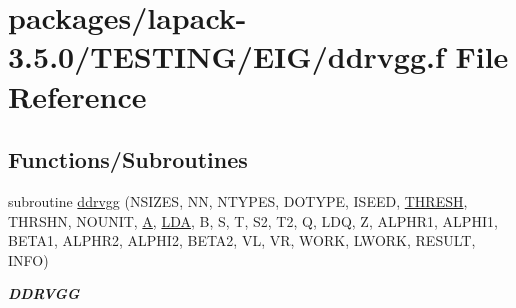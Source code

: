 \hypertarget{ddrvgg_8f}{}\section{packages/lapack-\/3.5.0/\+T\+E\+S\+T\+I\+N\+G/\+E\+I\+G/ddrvgg.f File Reference}
\label{ddrvgg_8f}
\subsection*{Functions/\+Subroutines}
\begin{DoxyCompactItemize}
\item 
subroutine \hyperlink{group__double__eig_gaf88edcce9dcbf23eda454e31d1b422db}{ddrvgg} (N\+S\+I\+Z\+E\+S, N\+N, N\+T\+Y\+P\+E\+S, D\+O\+T\+Y\+P\+E, I\+S\+E\+E\+D, \hyperlink{zlaqgs_8c_a0656018abfc9fa2821827415f5d5ea57}{T\+H\+R\+E\+S\+H}, T\+H\+R\+S\+H\+N, N\+O\+U\+N\+I\+T, \hyperlink{classA}{A}, \hyperlink{example__user_8c_ae946da542ce0db94dced19b2ecefd1aa}{L\+D\+A}, B, S, T, S2, T2, Q, L\+D\+Q, Z, A\+L\+P\+H\+R1, A\+L\+P\+H\+I1, B\+E\+T\+A1, A\+L\+P\+H\+R2, A\+L\+P\+H\+I2, B\+E\+T\+A2, V\+L, V\+R, W\+O\+R\+K, L\+W\+O\+R\+K, R\+E\+S\+U\+L\+T, I\+N\+F\+O)
\begin{DoxyCompactList}\small\item\em {\bfseries D\+D\+R\+V\+G\+G} \end{DoxyCompactList}\end{DoxyCompactItemize}
